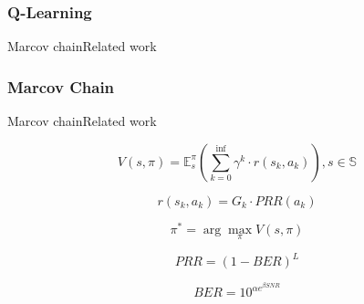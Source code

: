 \subsubsection{Q-Learning}


\begin{frame}{Marcov chain}{Related work}
\end{frame}


\subsubsection{Marcov Chain}

\begin{frame}{Marcov chain}{Related work}

\begin{flushleft}
\begin{equation}
V(s, \pi)=\mathbb{E}_{s}^{\pi}\left(\sum_{k=0}^{\mathrm{inf}} \gamma^{k} \cdot r\left(s_{k}, a_{k}\right)\right), s \in \mathbb{S}
\end{equation}

\begin{equation}
r\left(s_{k}, a_{k}\right)=G_{k} \cdot P R R\left(a_{k}\right)
\end{equation}

\begin{equation}
\pi^{*}=\arg \max _{\pi} V(s, \pi)
\end{equation}


\begin{equation}
PRR=(1-BER)^{L}
\end{equation}

\begin{equation}
BER=10^{\alpha e^{\beta SNR}}
\end{equation}

\end{flushleft}

\end{frame}


